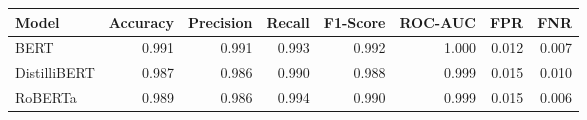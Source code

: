 \begin{tabular}{|l||r|r|r|r|r|r|r|}
\toprule
Model & \textbf{Accuracy} & \textbf{Precision} & Recall & \textbf{F1-Score} & \textbf{ROC-AUC} & \textbf{FPR} & FNR \\
\midrule \midrule
BERT & 0.991 & 0.991 & 0.993 & 0.992 & 1.000 & 0.012 & 0.007 \\
DistilliBERT & 0.987 & 0.986 & 0.990 & 0.988 & 0.999 & 0.015 & 0.010 \\
RoBERTa & 0.989 & 0.986 & 0.994 & 0.990 & 0.999 & 0.015 & 0.006 \\
\bottomrule
\end{tabular}
